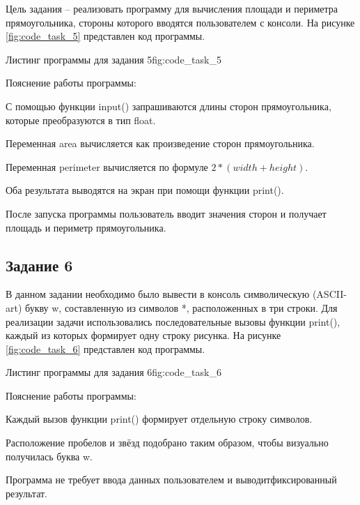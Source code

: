 \documentclass[]{vvsu}
\begin{document}
Цель задания -- реализовать программу для вычисления площади и периметра прямоугольника, стороны которого вводятся пользователем с консоли. На рисунке \ref{fig:code_task_5} представлен код программы.

\begin{vvsu_figure}{Листинг программы для задания 5}{fig:code_task_5}
  \begin{minipage}{.75\textwidth}
    
  \end{minipage}
\end{vvsu_figure}

Пояснение работы программы:
\begin{vvsu_list}
  \item С помощью функции input() запрашиваются длины сторон прямоугольника, которые преобразуются в тип float.
  \item Переменная area вычисляется как произведение сторон прямоугольника.
  \item Переменная perimeter вычисляется по формуле $2 * (width + height)$.
  \item Оба результата выводятся на экран при помощи функции print().
\end{vvsu_list}

После запуска программы пользователь вводит значения сторон и получает площадь и периметр прямоугольника.

\subsection{Задание 6}

В данном задании необходимо было вывести в консоль символическую (ASCII-art) букву w, составленную из символов *, расположенных в три строки.  
Для реализации задачи использовались последовательные вызовы функции print(), каждый из которых формирует одну строку рисунка.  
На рисунке \ref{fig:code_task_6} представлен код программы.

\begin{vvsu_figure}{Листинг программы для задания 6}{fig:code_task_6}
  \begin{minipage}{.75\textwidth}
    
  \end{minipage}
\end{vvsu_figure}

Пояснение работы программы:
\begin{vvsu_list}
  \item Каждый вызов функции print() формирует отдельную строку символов.
  \item Расположение пробелов и звёзд подобрано таким образом, чтобы визуально получилась буква w.
  \item Программа не требует ввода данных пользователем и выводит\linebreak фиксированный результат.
\end{vvsu_list}
\end{document}
